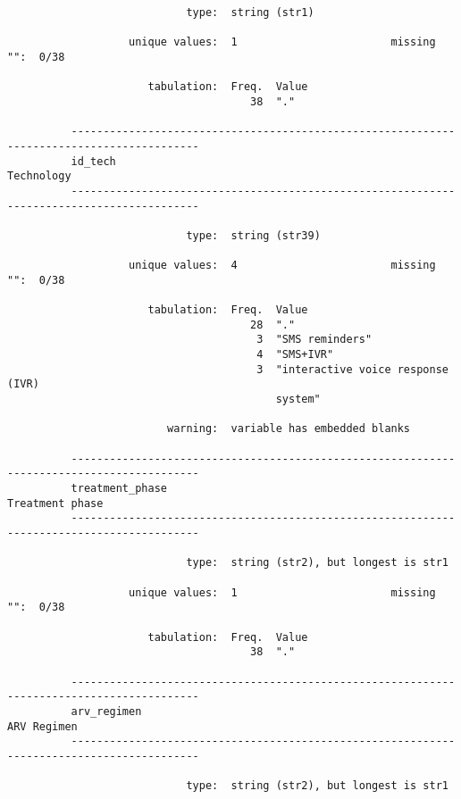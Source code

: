 \documentclass{article}
\begin{document}
\begin{verbatim}
                            type:  string (str1)
          
                   unique values:  1                        missing "":  0/38
          
                      tabulation:  Freq.  Value
                                      38  "."
          
          ------------------------------------------------------------------------------------------
          id_tech                                                                         Technology
          ------------------------------------------------------------------------------------------
          
                            type:  string (str39)
          
                   unique values:  4                        missing "":  0/38
          
                      tabulation:  Freq.  Value
                                      28  "."
                                       3  "SMS reminders"
                                       4  "SMS+IVR"
                                       3  "interactive voice response (IVR)
                                          system"
          
                         warning:  variable has embedded blanks
          
          ------------------------------------------------------------------------------------------
          treatment_phase                                                            Treatment phase
          ------------------------------------------------------------------------------------------
          
                            type:  string (str2), but longest is str1
          
                   unique values:  1                        missing "":  0/38
          
                      tabulation:  Freq.  Value
                                      38  "."
          
          ------------------------------------------------------------------------------------------
          arv_regimen                                                                    ARV Regimen
          ------------------------------------------------------------------------------------------
          
                            type:  string (str2), but longest is str1
          

\end{verbatim}
\end{document}
